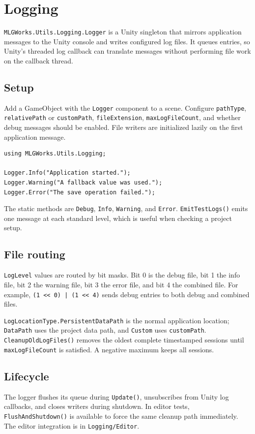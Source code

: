 \section{Logging}
\label{sec:logging}

\texttt{MLGWorks.Utils.Logging.Logger} is a Unity singleton that mirrors application messages to the Unity console and writes configured log files. It queues entries, so Unity's threaded log callback can translate messages without performing file work on the callback thread.

\subsection{Setup}
Add a GameObject with the \texttt{Logger} component to a scene. Configure \texttt{pathType}, \texttt{relativePath} or \texttt{customPath}, \texttt{fileExtension}, \texttt{maxLogFileCount}, and whether debug messages should be enabled. File writers are initialized lazily on the first application message.

\begin{lstlisting}
using MLGWorks.Utils.Logging;

Logger.Info("Application started.");
Logger.Warning("A fallback value was used.");
Logger.Error("The save operation failed.");
\end{lstlisting}

The static methods are \texttt{Debug}, \texttt{Info}, \texttt{Warning}, and \texttt{Error}. \texttt{EmitTestLogs()} emits one message at each standard level, which is useful when checking a project setup.

\subsection{File routing}
\texttt{LogLevel} values are routed by bit masks. Bit 0 is the debug file, bit 1 the info file, bit 2 the warning file, bit 3 the error file, and bit 4 the combined file. For example, \texttt{(1 << 0) | (1 << 4)} sends debug entries to both debug and combined files.

\texttt{LogLocationType.PersistentDataPath} is the normal application location; \texttt{DataPath} uses the project data path, and \texttt{Custom} uses \texttt{customPath}. \texttt{CleanupOldLogFiles()} removes the oldest complete timestamped sessions until \texttt{maxLogFileCount} is satisfied. A negative maximum keeps all sessions.

\subsection{Lifecycle}
The logger flushes its queue during \texttt{Update()}, unsubscribes from Unity log callbacks, and closes writers during shutdown. In editor tests, \texttt{FlushAndShutdown()} is available to force the same cleanup path immediately. The editor integration is in \texttt{Logging/Editor}.
